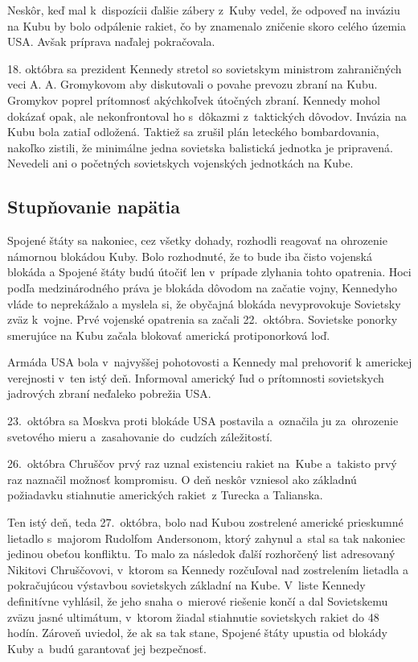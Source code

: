 \documentclass[a4paper]{article}
\begin{document}
Neskôr, keď mal k~dispozícii ďalšie zábery z~Kuby vedel, že odpoveď na inváziu na Kubu by bolo odpálenie rakiet, čo by znamenalo zničenie skoro celého územia USA. Avšak príprava naďalej pokračovala.

18. októbra sa prezident Kennedy stretol so sovietskym ministrom zahraničných veci A. A. Gromykovom aby diskutovali o povahe prevozu zbraní na Kubu. Gromykov poprel prítomnosť akýchkoľvek útočných zbraní. Kennedy mohol dokázať opak, ale nekonfrontoval ho s~dôkazmi z~taktických dôvodov. Invázia na Kubu bola zatiaľ odložená. Taktiež sa zrušil plán leteckého bombardovania, nakoľko zistili, že minimálne jedna sovietska balistická jednotka je pripravená. Nevedeli ani o početných sovietskych vojenských jednotkách na Kube.

\subsection{Stupňovanie napätia}
Spojené štáty sa nakoniec, cez všetky dohady, rozhodli reagovať na ohrozenie námornou blokádou Kuby. Bolo rozhodnuté, že to bude iba čisto vojenská \hbox{blokáda} a Spojené štáty budú útočiť len v~prípade zlyhania tohto opatrenia. Hoci podľa medzinárodného práva je blokáda dôvodom na začatie vojny, Kennedyho vláde to neprekážalo a myslela si, že obyčajná blokáda nevyprovokuje Sovietsky zväz k~vojne. Prvé vojenské opatrenia sa začali 22.~októbra. Sovietske ponorky smerujúce na Kubu začala blokovať americká protiponorková loď.

Armáda USA bola v~najvyššej pohotovosti a Kennedy mal prehovoriť k americkej verejnosti v~ten istý deň. Informoval americký ľud o prítomnosti sovietskych jadrových zbraní neďaleko pobrežia USA.

23.~októbra sa Moskva proti blokáde USA postavila a~označila ju za~ohrozenie svetového mieru a~zasahovanie do~cudzích záležitostí.

26.~októbra Chruščov prvý raz uznal existenciu rakiet na~Kube a~takisto prvý raz naznačil možnosť kompromisu. O deň neskôr vzniesol ako základnú požiadavku stiahnutie amerických rakiet~z Turecka a Talianska. 

Ten istý deň, teda 27.~októbra, bolo nad Kubou zostrelené americké prieskumné lietadlo s~majorom Rudolfom Andersonom, ktorý zahynul a~stal sa tak nakoniec jedinou obeťou konfliktu. To malo za následok ďalší rozhorčený list adresovaný Nikitovi Chruščovovi, v~ktorom sa Kennedy rozčuľoval nad zostrelením lietadla a pokračujúcou výstavbou sovietskych základní na Kube. V~liste Kennedy definitívne vyhlásil, že jeho snaha o~mierové riešenie končí a dal Sovietskemu zväzu jasné ultimátum, v~ktorom žiadal stiahnutie sovietskych rakiet do 48 hodín. Zároveň uviedol, že ak sa tak stane, Spojené štáty upustia od blokády Kuby a~budú garantovať jej bezpečnosť.
\end{document}
